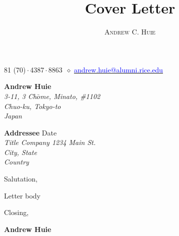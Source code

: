 \documentclass[10pt, a4paper]{article}
\makeatletter
\renewcommand{\maketitle}{
    \begin{center}
        {\Huge\theauthor}

        \vspace{0.25em}

        \raisebox{.3ex}{\footnotesize+}81 (70)\,$\cdot$\,4387\,$\cdot$\,8863~$\diamond$
        \href{mailto:andrew.huie@alumni.rice.edu}{\textcolor{blue}{
            andrew.huie@alumni.rice.edu
        }}

    \end{center}
}
\makeatother
\begin{document}
\title{Cover Letter}
\author{\textsc{Andrew C. Huie}}

\maketitle

\vspace{2em}

\begin{flushright}
    {\color{Gray}
    \textbf{Andrew Huie}\\
    \textsl{
        3-11, 3 Ch$\bar{o}$me, Minato, \#1102\\
        Chuo-ku, Tokyo-to\\
        Japan\\
    }}
\end{flushright}

\vspace{1em}

\textbf{Addressee} \hfill Date\\
\textsl{
    Title
    Company
    1234 Main St.\\
    City, State\\
    Country\\
}

Salutation,

Letter body

Closing,\\

\vspace{2em}

\textbf{Andrew Huie}
\end{document}
